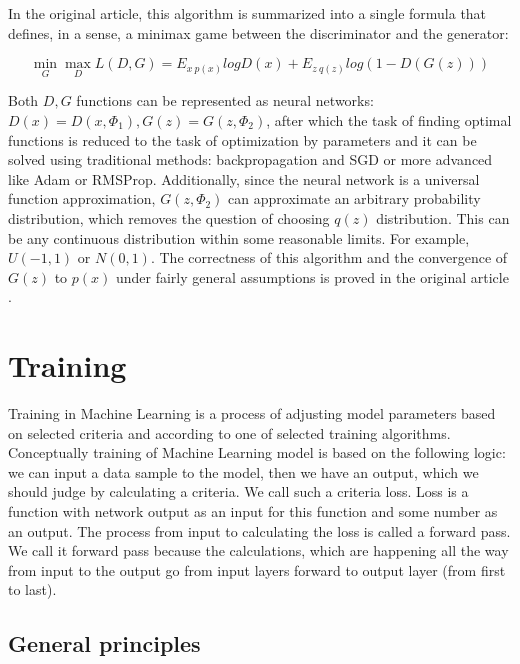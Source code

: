 In the original article, this algorithm is summarized into a single formula that defines, in a sense, a minimax game between the discriminator and the generator:

\begin{equation}
    \label{eq:gan-4}
    \min_{G}\max_{D} L(D, G) = E_{x~p(x)} log D(x) + E_{z~q(z)} log(1-D(G(z)))
\end{equation}

Both $D, G$ functions can be represented as neural networks: $D(x) = D(x, \Phi_1), G(z) = G(z, \Phi_2)$, after which the task of finding optimal functions is reduced to the task of optimization by parameters and it can be solved using traditional methods: backpropagation and SGD or more advanced like Adam or RMSProp. Additionally, since the neural network is a universal function approximation, $G(z, \Phi_2)$ can approximate an arbitrary probability distribution, which removes the question of choosing $q(z)$ distribution. This can be any continuous distribution within some reasonable limits. For example, $U(-1, 1)$ or $N(0, 1)$. The correctness of this algorithm and the convergence of $G(z)$ to $p(x)$ under fairly general assumptions is proved in the original article \cite{Goodfellow_Pouget-Abadie_Mirza_Xu_Warde-Farley_Ozair_Courville_Bengio_2014}.

\section{Training}

Training in Machine Learning is a process of adjusting model parameters based on selected criteria and according to one of selected training algorithms. Conceptually training of Machine Learning model is based on the following logic: we can input a data sample to the model, then we have an output, which we should judge by calculating a criteria. We call such a criteria loss. Loss is a function with network output as an input for this function and some number as an output. The process from input to calculating the loss is called a forward pass. We call it forward pass because the calculations, which are happening all the way from input to the output go from input layers forward to output layer (from first to last).

\subsection{General principles}


